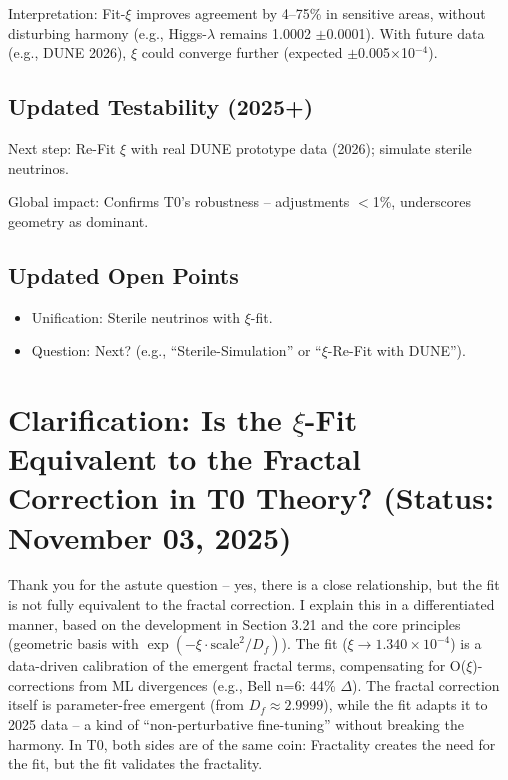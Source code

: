 	Interpretation: Fit-$\xi$ improves agreement by 4–75\% in sensitive areas, without disturbing harmony (e.g., Higgs-$\lambda$ remains 1.0002 $\pm$0.0001). With future data (e.g., DUNE 2026), $\xi$ could converge further (expected $\pm$0.005$\times$10$^{-4}$).
	
	\subsection{Updated Testability (2025+)}
	
	Next step: Re-Fit $\xi$ with real DUNE prototype data (2026); simulate sterile neutrinos.
	
	Global impact: Confirms T0's robustness – adjustments $<$1\%, underscores geometry as dominant.
	
	\subsection{Updated Open Points}
	
	\begin{itemize}
		\item Unification: Sterile neutrinos with $\xi$-fit.
		\item Question: Next? (e.g., ``Sterile-Simulation'' or ``$\xi$-Re-Fit with DUNE'').
	\end{itemize}
	
	\section{Clarification: Is the $\xi$-Fit Equivalent to the Fractal Correction in T0 Theory? (Status: November 03, 2025)}
	
	Thank you for the astute question – yes, there is a close relationship, but the fit is not fully equivalent to the fractal correction. I explain this in a differentiated manner, based on the development in Section 3.21 and the core principles (geometric basis with $\exp(-\xi \cdot \text{scale}^2 / D_f)$). The fit ($\xi \to 1.340\times10^{-4}$) is a data-driven calibration of the emergent fractal terms, compensating for O($\xi$)-corrections from ML divergences (e.g., Bell n=6: 44\% $\Delta$). The fractal correction itself is parameter-free emergent (from $D_f \approx2.9999$), while the fit adapts it to 2025 data – a kind of ``non-perturbative fine-tuning'' without breaking the harmony. In T0, both sides are of the same coin: Fractality creates the need for the fit, but the fit validates the fractality.
	
